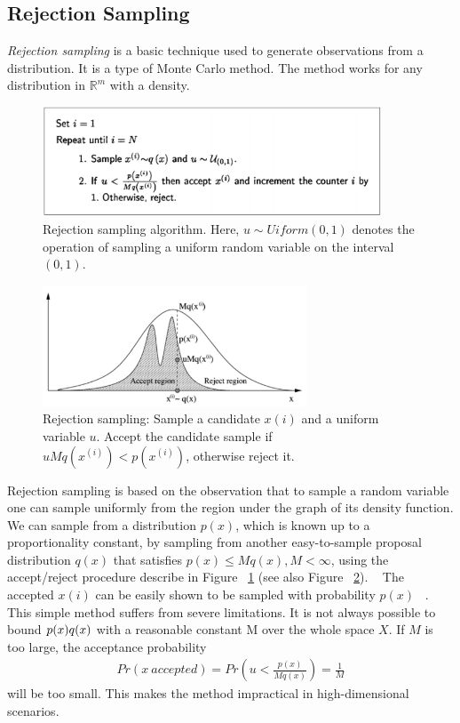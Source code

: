 \subsection{Rejection Sampling}
\textit{Rejection sampling} is a basic technique used to generate observations from a distribution. It is a type of Monte Carlo method. The method works for any distribution in $\mathbb{R}^m$ with a density.

\begin{figure}
    \centering
    \includegraphics[width=0.9\textwidth]{figures/rj1.png}
    \caption{Rejection sampling algorithm. Here, $u \sim Uiform(0,1)$ denotes the operation of sampling a uniform random variable on the interval $(0,1)$.}
    \label{fig:rj1}
\end{figure}

\begin{figure}
    \centering
    \includegraphics[width=0.7\textwidth]{figures/rj2.png}
    \caption{Rejection sampling: Sample a candidate $x(i)$ and a uniform variable $u$. Accept the candidate sample if $uMq(x^{(i)}) < p(x^{(i)})$, otherwise reject it.}
    \label{fig:rj2}
\end{figure}

Rejection sampling is based on the observation that to sample a random variable one can sample uniformly from the region under the graph of its density function. We can sample from a distribution $p(x)$, which is known up to a proportionality constant, by sampling from another easy-to-sample proposal distribution $q(x)$ that satisﬁes $p(x) \leq Mq(x), M < \infty$, using the accept/reject procedure describe in Figure ~\ref{fig:rj1} (see also Figure ~\ref{fig:rj2}). ~\cite{mcmc}
The accepted $x(i)$ can be easily shown to be sampled with probability $p(x)$ ~\cite{robert}. This simple method suffers from severe limitations. It is not always
possible to bound $p(x) \/ q(x)$ with a reasonable constant M over the whole space $X$. If $M$ is too large, the acceptance probability 
\begin{align*}
  Pr(x ~ accepted) = Pr(u < \frac{p(x)}{Mq(x)}) = \frac{1}{M}
\end{align*}
will be too small. This makes the method impractical in high-dimensional scenarios.

